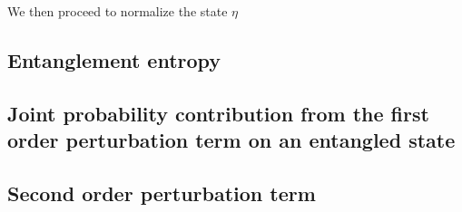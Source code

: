 We then proceed to normalize the state $\eta$

\subsection{Entanglement entropy}

\subsection{Joint probability contribution from the first order perturbation term on an entangled state}

\subsection{Second order perturbation term}

